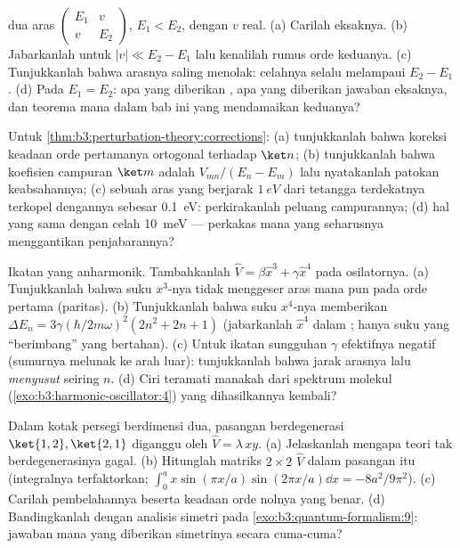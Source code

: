\begin{exercise}[$\star$]\label{exo:b3:perturbation-theory:3}
 dua aras $\begin{pmatrix}E_1 & v\\ v &
E_2\end{pmatrix}$, $E_1 < E_2$, dengan $v$ real. (a) Carilah  eksaknya. (b) Jabarkanlah untuk $|v| \ll E_2 - E_1$ lalu kenalilah
rumus orde keduanya. (c) Tunjukkanlah bahwa arasnya saling menolak:
celahnya selalu melampaui $E_2 - E_1$. (d) Pada $E_1 = E_2$: apa yang
diberikan , apa yang diberikan jawaban eksaknya, dan
teorema mana dalam bab ini yang mendamaikan keduanya?
\end{exercise}

\begin{exercise}[$\star$]\label{exo:b3:perturbation-theory:4}
Untuk \cref{thm:b3:perturbation-theory:corrections}: (a) tunjukkanlah
bahwa koreksi keadaan orde pertamanya ortogonal terhadap $\ket n$; (b)
tunjukkanlah bahwa koefisien campuran $\ket m$ adalah
$V_{mn}/(E_n - E_m)$ lalu nyatakanlah patokan keabsahannya; (c) sebuah
aras yang berjarak $\qty{1}{eV}$ dari tetangga terdekatnya terkopel
dengannya sebesar \qty{0.1}{eV}: perkirakanlah peluang campurannya; (d)
hal yang sama dengan celah \qty{10}{meV} --- perkakas mana yang
seharusnya menggantikan penjabarannya?
\end{exercise}

\begin{exercise}[$\star\star$]\label{exo:b3:perturbation-theory:5}
Ikatan yang anharmonik. Tambahkanlah $\hat V = \beta\hat x^3 + \gamma\hat x^4$
pada osilatornya. (a) Tunjukkanlah bahwa suku $x^3$-nya tidak menggeser
aras mana pun pada orde pertama (paritas). (b) Tunjukkanlah bahwa suku
$x^4$-nya memberikan $\Delta E_n =
3\gamma(\hbar/2m\omega)^2(2n^2 + 2n + 1)$ (jabarkanlah $\hat x^4$ dalam
; hanya suku yang ``berimbang'' yang bertahan). (c) Untuk ikatan sungguhan $\gamma$ efektifnya negatif (sumurnya
melunak ke arah luar): tunjukkanlah bahwa jarak arasnya lalu
\emph{menyusut} seiring $n$.
(d) Ciri teramati manakah dari spektrum molekul
(\cref{exo:b3:harmonic-oscillator:4}) yang dihasilkannya kembali?
\end{exercise}

\begin{exercise}[$\star\star$]\label{exo:b3:perturbation-theory:6}
Dalam kotak persegi berdimensi dua, pasangan berdegenerasi $\ket{1,2},
\ket{2,1}$ diganggu oleh $\hat V = \lambda\,xy$. (a) Jelaskanlah mengapa
teori tak berdegenerasinya gagal. (b) Hitunglah matriks $2\times2$
$\hat V$ dalam pasangan itu (integralnya terfaktorkan; $\int_0^a
x\sin(\pi x/a)\sin(2\pi x/a)\dd x = -8a^2/9\pi^2$). (c) Carilah
pembelahannya beserta keadaan orde nolnya yang benar. (d)
Bandingkanlah dengan analisis simetri pada
\cref{exo:b3:quantum-formalism:9}: jawaban mana yang diberikan
simetrinya secara cuma-cuma?
\end{exercise}

